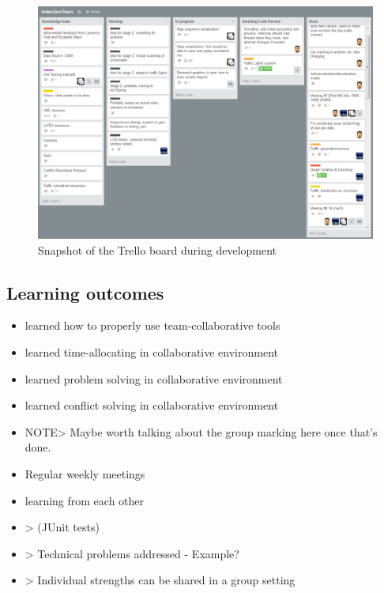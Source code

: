 \begin{figure}[!h]
	\vspace{1.5em}
  	\caption{Snapshot of the Trello board during development}
  	\label{fig:trello}
  	\centering
	\includegraphics[width=1\textwidth]{figs/Tools/trello.png}
  	\vspace{1.5em}
\end{figure}


\subsection{Learning outcomes}

\begin{itemize}
    \item learned how to properly use team-collaborative tools
    \item learned time-allocating in collaborative environment
    \item learned  problem solving in collaborative environment
    \item learned  conflict solving in collaborative environment
    \item NOTE> Maybe worth talking about the group marking here once that's done.
    \item Regular weekly meetings
    \item learning from each other
    \item > (JUnit tests)
    \item > Technical problems addressed - Example?
    \item > Individual strengths can be shared in a group setting
\end {itemize}

